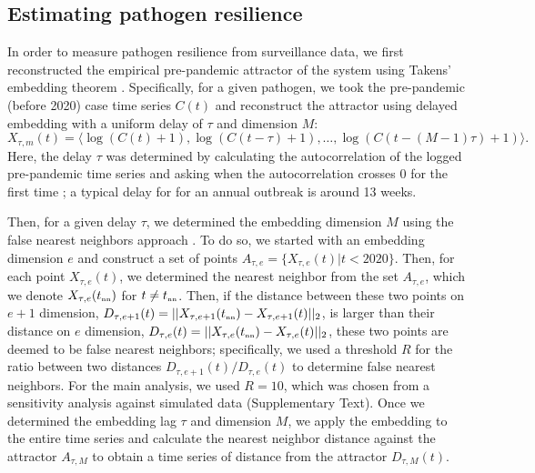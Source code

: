 \documentclass[12pt]{article}
\newcommand{\tsub}[2]{#1_{{\textrm{\tiny #2}}}}
\begin{document}
\subsection*{Estimating pathogen resilience}

In order to measure pathogen resilience from surveillance data, we first reconstructed the empirical pre-pandemic attractor of the system using Takens' embedding theorem \citep{takens2006detecting}.
Specifically, for a given pathogen, we took the pre-pandemic (before 2020) case time series $C(t)$ and reconstruct the attractor using delayed embedding with a uniform delay of $\tau$ and dimension $M$:
\begin{equation}
X_{\tau,m}(t) = \langle\log(C(t)+1), \log(C(t-\tau)+1), \dots, \log(C(t-(M-1)\tau)+1)\rangle.
\end{equation}
Here, the delay $\tau$ was determined by calculating the autocorrelation of the logged pre-pandemic time series and asking when the autocorrelation crosses 0 for the first time \citep{tan2023selecting};
a typical delay for for an annual outbreak is around 13 weeks.

Then, for a given delay $\tau$, we determined the embedding dimension $M$ using the false nearest neighbors approach \citep{kennel1992determining,tan2023selecting}.
To do so, we started with an embedding dimension $e$ and construct a set of points $A_{\tau,e}= \{X_{\tau,e}(t) | t < 2020\}$.
Then, for each point $X_{\tau,e}(t)$, we determined the nearest neighbor from the set $A_{\tau,e}$, which we denote $X_{\tau,e}(\tsub{t}{nn})$ for $t \neq \tsub{t}{nn}$.
Then, if the distance between these two points on $e+1$ dimension, $D_{\tau,e+1}(t) = ||X_{\tau,e+1}(\tsub{t}{nn})-X_{\tau,e+1}(t)||_2$, is larger than their distance on $e$ dimension, $D_{\tau,e}(t) = ||X_{\tau,e}(\tsub{t}{nn})-X_{\tau,e}(t)||_2$, these two points are deemed to be false nearest neighbors;
specifically, we used a threshold $R$ for the ratio between two distances $D_{\tau,e+1}(t)/D_{\tau,e}(t)$ to determine false nearest neighbors.
For the main analysis, we used $R=10$, which was chosen from a sensitivity analysis against simulated data (Supplementary Text).
Once we determined the embedding lag $\tau$ and dimension $M$, we apply the embedding to the entire time series and calculate the nearest neighbor distance against the attractor $A_{\tau,M}$ to obtain a time series of distance from the attractor $D_{\tau,M}(t)$.
\end{document}
